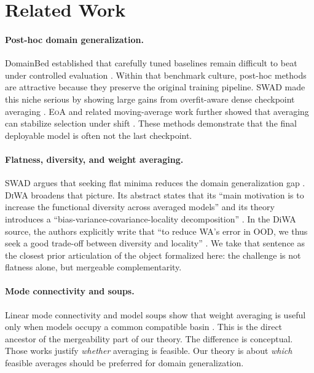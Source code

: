 \documentclass{article}
\theoremstyle{definition}
\newcommand{\swad}{\textup{\textsc{SWAD}}}
\newcommand{\diwa}{\textup{\textsc{DiWA}}}
\newcommand{\eoa}{\textup{\textsc{EoA}}}
\newcommand{\ood}{\textup{\textsc{OOD}}}
\begin{document}
\section{Related Work}

\paragraph{Post-hoc domain generalization.}
DomainBed established that carefully tuned baselines remain difficult to beat under controlled evaluation \citep{gulrajani2021domainbed}. Within that benchmark culture, post-hoc methods are attractive because they preserve the original training pipeline. \swad{} made this niche serious by showing large gains from overfit-aware dense checkpoint averaging \citep{cha2021swad}. \eoa{} and related moving-average work further showed that averaging can stabilize selection under shift \citep{arpit2021ensemble}. These methods demonstrate that the final deployable model is often not the last checkpoint.

\paragraph{Flatness, diversity, and weight averaging.}
\swad{} argues that seeking flat minima reduces the domain generalization gap \citep{cha2021swad}. \diwa{} broadens that picture. Its abstract states that its ``main motivation is to increase the functional diversity across averaged models'' and its theory introduces a ``bias-variance-covariance-locality decomposition'' \citep{rame2022diwa}. In the DiWA source, the authors explicitly write that ``to reduce WA's error in \ood{}, we thus seek a good trade-off between diversity and locality'' \citep{rame2022diwa}. We take that sentence as the closest prior articulation of the object formalized here: the challenge is not flatness alone, but mergeable complementarity.

\paragraph{Mode connectivity and soups.}
Linear mode connectivity and model soups show that weight averaging is useful only when models occupy a common compatible basin \citep{frankle2020linear,wortsman2022soups}. This is the direct ancestor of the mergeability part of our theory. The difference is conceptual. Those works justify \emph{whether} averaging is feasible. Our theory is about \emph{which} feasible averages should be preferred for domain generalization.
\end{document}
